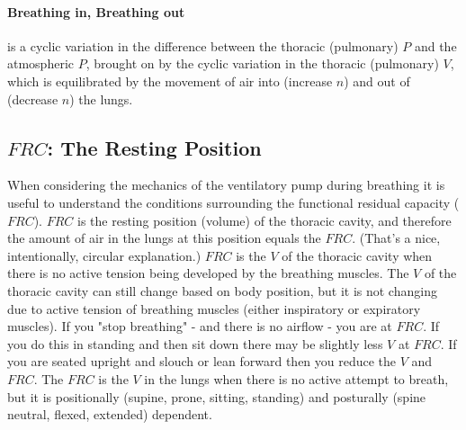 \paragraph{Breathing in, Breathing out} is a cyclic variation in the difference between the thoracic (pulmonary) $P$ and the atmospheric $P$, brought on by the cyclic variation in the thoracic (pulmonary) $V$, which is equilibrated by the movement of air into (increase $n$) and out of (decrease $n$) the lungs.

\subsection{$FRC$: The Resting Position}

When considering the mechanics of the ventilatory pump during breathing it is useful to understand the conditions surrounding the functional residual capacity ($FRC$). $FRC$ is the resting position (volume) of the thoracic cavity, and therefore the amount of air in the lungs at this position equals the $FRC$. (That's a nice, intentionally, circular explanation.) 
$FRC$ is the $V$ of the thoracic cavity when there is no active tension being developed by the breathing muscles. The $V$ of the thoracic cavity can still change based on body position, but it is not changing due to active tension of breathing muscles (either inspiratory or expiratory muscles). If you "stop breathing" - and there is no airflow - you are at $FRC$. If you do this in standing and then sit down there may be slightly less $V$ at $FRC$. If you are seated upright and slouch or lean forward then you reduce the $V$ and $FRC$. The $FRC$ is the $V$ in the lungs when there is no active attempt to breath, but it is positionally (supine, prone, sitting, standing) and posturally (spine neutral, flexed, extended) dependent.

